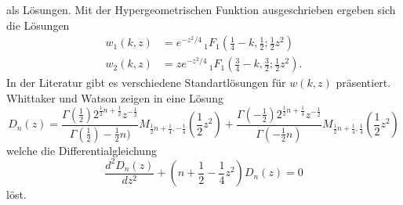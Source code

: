 als Lösungen.
Mit der Hypergeometrischen Funktion ausgeschrieben ergeben sich die Lösungen
\begin{align}
	\label{parzyl:eq:solution_dgl}
    w_1(k,z) &= e^{-z^2/4} \,
    {}_{1} F_{1}
    (
        {\textstyle \frac{1}{4}} 
         - k, {\textstyle \frac{1}{2}} ; {\textstyle \frac{1}{2}}z^2) \\
    w_2(k,z) & = z e^{-z^2/4} \,
         {}_{1} F_{1}
         ({\textstyle \frac{3}{4}} 
              - k, {\textstyle \frac{3}{2}} ; {\textstyle \frac{1}{2}}z^2).
\end{align}
In der Literatur gibt es verschiedene Standartlösungen für $w(k,z)$ präsentiert.
Whittaker und Watson zeigen in \cite{parzyl:whittaker} eine Lösung
\begin{equation}
    D_n(z) = \frac{
            \Gamma \left( {\textstyle \frac{1}{2}}\right) 2^{\frac{1}{2}n + \frac{1}{2}} z^{-\frac{1}{2}}
        }{
            \Gamma \left( {\textstyle \frac{1}{2}} \right) - {\textstyle \frac{1}{2}} n)
        }
        M_{\frac{1}{2} n + \frac{1}{4}, - \frac{1}{4}} \left(\frac{1}{2}z^2\right)
        +
        \frac{
            \Gamma\left(-{\textstyle \frac{1}{2}}\right) 2^{\frac{1}{2}n + \frac{1}{4}} z^{-\frac{1}{2}}
        }{
            \Gamma\left(- {\textstyle \frac{1}{2}} n\right)
        }
        M_{\frac{1}{2} n + \frac{1}{4}, \frac{1}{4}} \left(\frac{1}{2}z^2\right)
\end{equation}
welche die Differentialgleichung
\begin{equation}
    \frac{d^2D_n(z)}{dz^2} + \left(n + \frac{1}{2} - \frac{1}{4} z^2\right)D_n(z) = 0
\end{equation}
löst.

